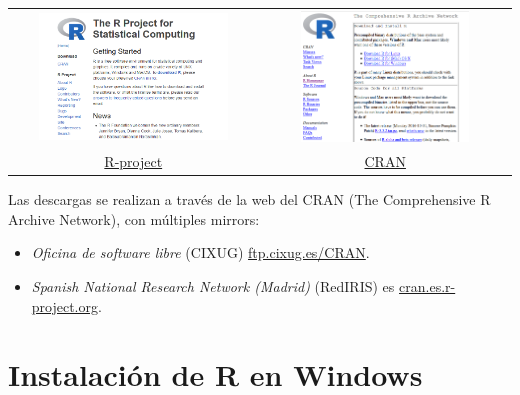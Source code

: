 \documentclass[
]{book}
\providecommand{\tightlist}{%
  \setlength{\itemsep}{0pt}\setlength{\parskip}{0pt}}
\begin{document}
\begin{longtable}[]{@{}cc@{}}
\toprule
\endhead
\includegraphics[width=0.8\textwidth,height=\textheight]{images/rproject.png} & \includegraphics[width=0.7\textwidth,height=\textheight]{images/cran.png}\tabularnewline
\href{https://r-project.org}{R-project} & \href{https://cran.r-project.org}{CRAN}\tabularnewline
\bottomrule
\end{longtable}

Las descargas se realizan a través de la web del CRAN (The Comprehensive
R Archive Network), con múltiples mirrors:

\begin{itemize}
\tightlist
\item
  \emph{Oficina de software libre} (CIXUG) \href{http://ftp.cixug.es/CRAN/}{ftp.cixug.es/CRAN}.
\item
  \emph{Spanish National Research Network (Madrid)} (RedIRIS) es
  \href{http://cran.es.r-project.org/}{cran.es.r-project.org}.
\end{itemize}

\hypertarget{instalaciuxf3n-de-r-en-windows}{%
\section{Instalación de R en Windows}\label{instalaciuxf3n-de-r-en-windows}}
\end{document}
